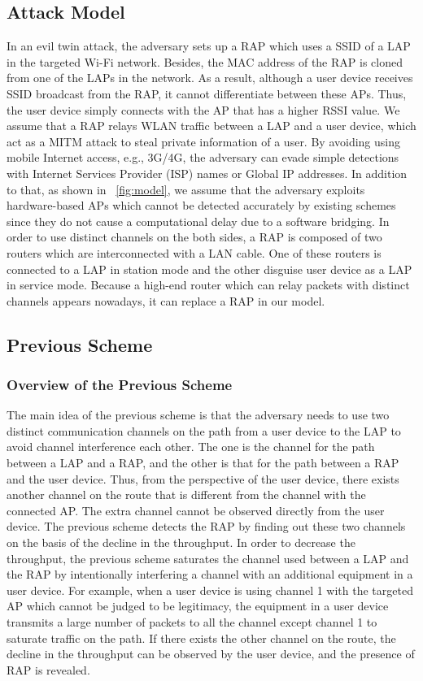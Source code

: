 \documentclass[conference]{IEEEtran}
\begin{document}
\subsection{Attack Model}
In an evil twin attack, the adversary sets up a RAP which uses a SSID of a LAP in the targeted Wi-Fi network.
Besides, the MAC address of the RAP is cloned from one of the LAPs in the network\cite{spoof-evi}.
As a result, although a user device receives SSID broadcast from the RAP, it cannot differentiate between these APs.
Thus, the user device simply connects with the AP that has a higher RSSI value.
We assume that a RAP relays WLAN traffic between a LAP and a user device, which act as a MITM attack to steal private information of a user.
By avoiding using mobile Internet access, e.g., 3G/4G, the adversary can evade simple detections with Internet Services Provider (ISP) names or Global IP addresses\cite{rtt}.
In addition to that, as shown in \figurename~\ref{fig:model}, we assume that the adversary exploits hardware-based APs which cannot be detected accurately by existing schemes since they do not cause a computational delay due to a software bridging\cite{previous}.
In order to use distinct channels on the both sides, a RAP is composed of two routers which are interconnected with a LAN cable.
One of these routers is connected to a LAP in station mode and the other disguise user device as a LAP in service mode.
Because a high-end router which can relay packets with distinct channels appears nowadays, it can replace a RAP in our model.

\subsection{Previous Scheme}
\subsubsection{Overview of the Previous Scheme}
The main idea of the previous scheme \cite{previous} is that the adversary needs to use two distinct communication channels on the path from a user device to the LAP to avoid channel interference each other.
The one is the channel for the path between a LAP and a RAP, and the other is that for the path between a RAP and the user device.
Thus, from the perspective of the user device, there exists another channel on the route that is different from the channel with the connected AP.
The extra channel cannot be observed directly from the user device.
The previous scheme detects the RAP by finding out these two channels on the basis of the decline in the throughput.
In order to decrease the throughput, the previous scheme saturates the channel used between a LAP and the RAP by intentionally interfering a channel with an additional equipment in a user device.
For example, when a user device is using channel 1 with the targeted AP which cannot be judged to be legitimacy, the equipment in a user device transmits a large number of packets to all the channel except channel 1 to saturate traffic on the path.
If there exists the other channel on the route, the decline in the throughput can be observed by the user device, and the presence of RAP is revealed.
\end{document}
